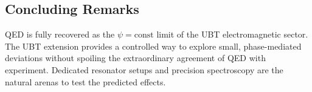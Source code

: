 \subsection*{Concluding Remarks}
QED is fully recovered as the $\psi=\mathrm{const}$ limit of the UBT electromagnetic sector. The UBT extension provides a controlled way to explore small, phase-mediated deviations without spoiling the extraordinary agreement of QED with experiment. Dedicated resonator setups and precision spectroscopy are the natural arenas to test the predicted effects.
